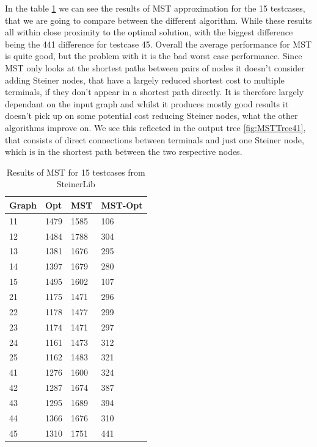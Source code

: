 In the table \ref{tab:MSTResults} we can see the results of MST approximation for the 15 testcases, that we are going to compare between the different algorithm. While these results all within close proximity to the optimal solution, with the biggest difference being the 441 difference for testcase 45. Overall the average performance for MST is quite good, but the problem with it is the bad worst case performance. Since MST only looks at the shortest paths between pairs of nodes it doesn't consider adding Steiner nodes, that have a largely reduced shortest cost to multiple terminals, if they don't appear in a shortest path directly. It is therefore largely dependant on the input graph and whilst it produces mostly good results it doesn't pick up on some potential cost reducing Steiner nodes, what the other algorithms improve on. We see this reflected in the output tree \ref{fig:MSTTree41}, that consists of direct connections between terminals and just one Steiner node, which is in the shortest path between the two respective nodes. 
\begin{table}[htbp]
 \caption{Results of MST for 15 testcases from SteinerLib \cite{Dui93}}\label{tab:MSTResults} 	
 \centering
 \begin{tabular}{l l l l}
\toprule
Graph & Opt & MST & MST-Opt \\
\midrule
11	& 1479	& 1585		& 106 \\
12	& 1484	& 1788		& 304 \\
13	& 1381	& 1676		& 295 \\
14	& 1397	& 1679		& 280 \\
15	& 1495	& 1602		& 107 \\
\midrule 
21	& 1175	& 1471		& 296 \\
22	& 1178	& 1477		& 299 \\
23	& 1174	& 1471		& 297 \\
24	& 1161	& 1473	 	& 312 \\
25	& 1162	& 1483		& 321 \\
\midrule
41	& 1276	& 1600		& 324 \\
42	& 1287	& 1674		& 387 \\
43	& 1295	& 1689		& 394 \\
44	& 1366	& 1676		& 310 \\
45	& 1310	& 1751		& 441 \\
\bottomrule
\end{tabular}
\end{table}

